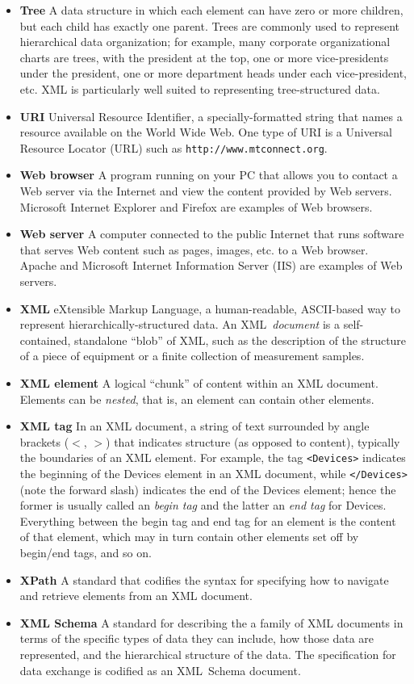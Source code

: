 \begin{itemize}
\item \textbf{Tree} A data structure in which each element can have
  zero or more children, but each child has exactly one parent.  Trees
  are commonly used to represent hierarchical data organization; for
  example, many corporate organizational charts are trees, with the
  president at the top, one or more vice-presidents under the president,
  one or more department heads under each vice-president, etc.  XML is
  particularly well suited to representing tree-structured data.
\item \textbf{URI} Universal Resource Identifier, a specially-formatted string
  that names a resource available on the World Wide Web.  One type of
  URI is a Universal Resource Locator (URL) such as
  \texttt{http://www.mtconnect.org}. 
\item \textbf{Web browser} A program running on your PC that allows you to
  contact a Web server via the Internet and view
  the content provided by Web servers.  Microsoft Internet Explorer and
  Firefox are examples of Web browsers.
\item \textbf{Web server} A computer connected to the public Internet that runs
  software that serves Web content such as pages, images, etc. to a Web
  browser.  Apache and Microsoft Internet Information Server (IIS) are
  examples of Web servers.
\item \textbf{XML} eXtensible Markup Language, a human-readable, ASCII-based way
  to represent hierarchically-structured data.  An XML~\emph{document}
  is a self-contained, standalone ``blob'' of XML, such as the
  description of the structure of a piece of equipment or a finite collection
  of measurement samples.
\item \textbf{XML element} A logical ``chunk'' of content within an XML
  document. Elements can be \emph{nested}, that is, an element can
  contain other elements.
\item \textbf{XML tag} In an XML document, a string of text
  surrounded by angle brackets ($<$, $>$) that indicates
  structure (as opposed to content), typically the boundaries of an XML
  element.  For example, the tag
  \verb+<Devices>+ indicates the beginning of the Devices element in an
  XML document, while \verb+</Devices>+ (note the forward slash)
  indicates the end of the Devices
  element; hence the former is usually called an \emph{begin tag} and the
  latter an \emph{end tag} for Devices.  Everything between the begin
  tag and end tag for an element is the content of that element, which
  may in turn contain other elements set off by begin/end tags, and so on.
\item \textbf{XPath} A standard that codifies the syntax for specifying how to
  navigate and retrieve elements from an XML document.
\item \textbf{XML Schema} A standard for describing the a family of XML
  documents in terms of the  specific types of data
  they can include, how those data are represented, and the hierarchical
  structure of  the data.  The \mtc{} specification for data exchange is
  codified as an XML~Schema document.
\end{itemize}
